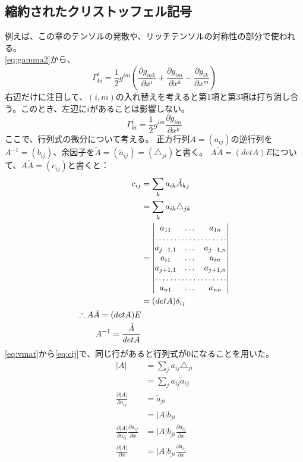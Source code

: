 \documentclass{jsarticle}
\begin{document}
\subsection{縮約されたクリストッフェル記号}
例えば、この章のテンソルの発散や、リッチテンソルの対称性の部分で使われる。\\
\eqref{eq:gamma2}から、
\begin{equation}
    \Gamma^{i}_{ki} =
    \frac{1}{2}g^{im} 
    \left(
    \frac{\partial{g_{mk}}}{\partial{x^{i}}}
     +
    \frac{\partial{g_{im}}}{\partial{x^{k}}}
     -
    \frac{\partial{g_{ik}}}{\partial{x^{m}}}
    \right)
\end{equation}
右辺だけに注目して、$(i, m)$の入れ替えを考えると第1項と第3項は打ち消し合う。このとき、左辺に$i$があることは影響しない。
\begin{equation}
    \Gamma^{i}_{ki} =
    \frac{1}{2}g^{im} 
    \frac{\partial{g_{im}}}{\partial{x^{k}}}\label{eq:gammaiki}
\end{equation}
ここで、行列式の微分について考える。
正方行列$A=(a_{ij})$の逆行列を$A^{-1}=(b_{ij})$、余因子を$\tilde{A}=(\tilde{a}_{ij})=(\triangle_{ji})$と書く。
$A\tilde{A}=(detA)E$について、$A\tilde{A} = (c_{ij})$と書くと：
\begin{align}
    c_{ij} &= \sum_{k}a_{ik}\tilde{A}_{kj}\\
           &= \sum_{k}a_{ik}\triangle_{jk}\\
           &= \begin{vmatrix}
                a_{11} & \dots & a_{1n}\\
                \hdotsfor{3}\\
                a_{j-1,1} & \dots & a_{j-1,n}\\
                a_{i1} & \dots & a_{in}\\
                a_{j+1,1} & \dots & a_{j+1,n}\\
                \hdotsfor{3}\\
                a_{n1} & \dots & a_{nn}
            \end{vmatrix}\label{eq:vmat}\\
           &= (detA)\delta_{ij}\label{eq:cij}\\
    \therefore A\tilde{A}=(detA)E\\
    A^{-1} = \frac{\tilde{A}}{detA}
\end{align}
\eqref{eq:vmat}から\eqref{eq:cij}で、同じ行があると行列式が0になることを用いた。
\begin{align}
    |A| &= \sum_{j}a_{ij}\triangle_{ji}\\
        &= \sum_{j}a_{ij}\tilde{a}_{ij}\\
    \frac{\partial{|A|}}{\partial{a_{ij}}} &= \tilde{a}_{ji}\\
                                           &= |A|b_{ji}\\
    \frac{\partial{|A|}}{\partial{a_{ij}}}\frac{\partial{a_{ij}}}{\partial{x}} &= |A|b_{ji}\frac{\partial{a_{ij}}}{\partial{x}}\\
    \frac{\partial{|A|}}{\partial{x}} &= |A|b_{ji}\frac{\partial{a_{ij}}}{\partial{x}}
\end{align}
\end{document}
